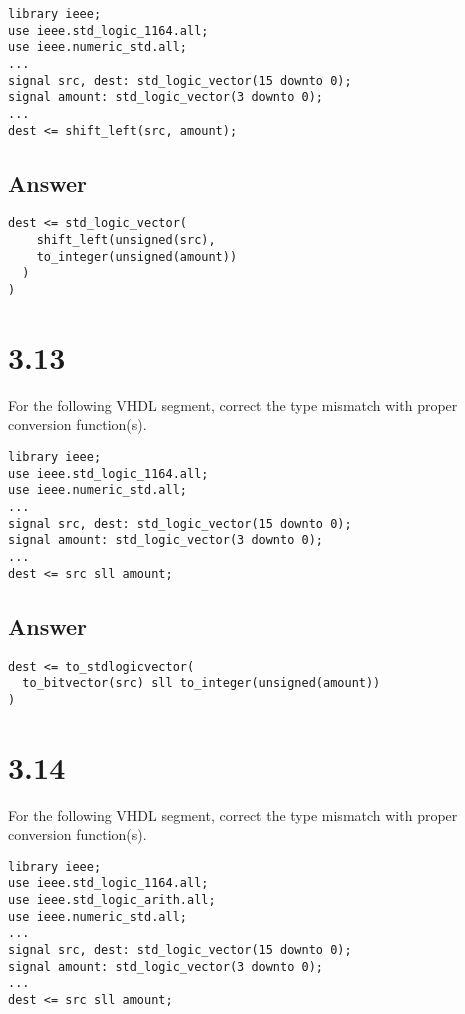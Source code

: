 \documentclass[dvipsnames, svgnames, x11names, a4paper,12pt]{article}
\begin{document}
\begin{lstlisting}
library ieee;
use ieee.std_logic_1164.all;
use ieee.numeric_std.all;
...
signal src, dest: std_logic_vector(15 downto 0);
signal amount: std_logic_vector(3 downto 0);
...
dest <= shift_left(src, amount);
\end{lstlisting}
\subsection{Answer}
\begin{lstlisting}
dest <= std_logic_vector(
    shift_left(unsigned(src), 
    to_integer(unsigned(amount))
  )
)
\end{lstlisting}
\section{3.13}    
For the following VHDL segment, correct the type mismatch with proper conversion
function(s).
\begin{lstlisting}
library ieee;
use ieee.std_logic_1164.all;
use ieee.numeric_std.all;
...
signal src, dest: std_logic_vector(15 downto 0);
signal amount: std_logic_vector(3 downto 0);
...
dest <= src sll amount;   
\end{lstlisting}
\subsection{Answer}
\begin{lstlisting}
dest <= to_stdlogicvector(
  to_bitvector(src) sll to_integer(unsigned(amount))
)
\end{lstlisting}
\section{3.14}    
 For the following VHDL segment, correct the type mismatch with proper conversion
function(s).
\begin{lstlisting}
library ieee;
use ieee.std_logic_1164.all;
use ieee.std_logic_arith.all;
use ieee.numeric_std.all;
...
signal src, dest: std_logic_vector(15 downto 0);
signal amount: std_logic_vector(3 downto 0);
...
dest <= src sll amount;
\end{lstlisting}
\end{document}
